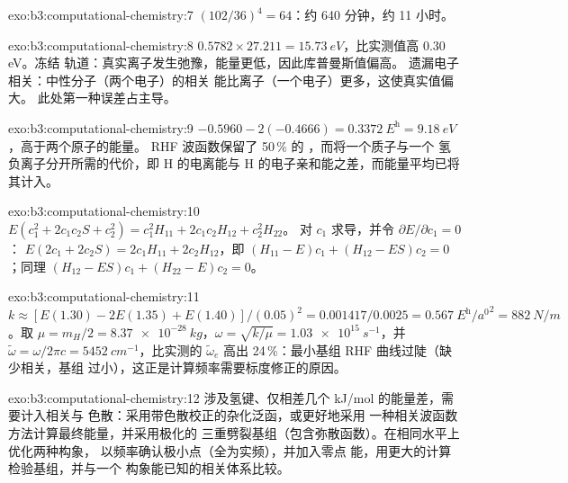 \begin{solution}{exo:b3:computational-chemistry:7}
$(102/36)^4 = 64$：约 640 分钟，约 11 小时。
\end{solution}

\begin{solution}{exo:b3:computational-chemistry:8}
$0.5782 \times 27.211 = \qty{15.73}{eV}$，比实测值高 0.30 eV。冻结
轨道：真实离子发生弛豫，能量更低，因此库普曼斯值偏高。
遗漏电子相关：中性分子（两个电子）的相关
能比离子（一个电子）更多，这使真实值偏大。
此处第一种误差占主导。
\end{solution}

\begin{solution}{exo:b3:computational-chemistry:9}
$-0.5960 - 2(-0.4666) = \qty{0.3372}{\hartree} = \qty{9.18}{eV}$，高于两个原子的能量。
RHF 波函数保留了 50\,\% 的 ，而将一个质子与一个
氢负离子分开所需的代价，即 H 的电离能与
H 的电子亲和能之差，而能量平均已将其计入。
\end{solution}

\begin{solution}{exo:b3:computational-chemistry:10}
$E(c_1^2 + 2c_1c_2S + c_2^2) = c_1^2H_{11} + 2c_1c_2H_{12} + c_2^2H_{22}$。
对 $c_1$ 求导，并令 $\partial E/\partial c_1 = 0$：
$E(2c_1 + 2c_2S) = 2c_1H_{11} + 2c_2H_{12}$，即 $(H_{11} - E)c_1 + (H_{12} -
ES)c_2 = 0$；同理 $(H_{12} - ES)c_1 + (H_{22} - E)c_2 = 0$。
\end{solution}

\begin{solution}{exo:b3:computational-chemistry:11}
$k \approx [E(1.30) - 2E(1.35) + E(1.40)]/(0.05)^2 = 0.001417/0.0025 =
\qty{0.567}{\hartree\per\bohr\squared} = \qty{882}{N/m}$。取 $\mu = m_H/2 =
\qty{8.37e-28}{kg}$，$\omega = \sqrt{k/\mu} = \qty{1.03e15}{s^{-1}}$，并
$\tilde\omega = \omega/2\pi c = \qty{5452}{cm^{-1}}$，比实测的
$\tilde\omega_e$ 高出 24\,\%：最小基组 RHF 曲线过陡（缺少相关，基组
过小），这正是计算频率需要标度修正的原因。
\end{solution}

\begin{solution}{exo:b3:computational-chemistry:12}
涉及氢键、仅相差几个 \unit{kJ/mol} 的能量差，需要计入相关与
色散：采用带色散校正的杂化泛函，或更好地采用
一种相关波函数方法计算最终能量，并采用极化的
三重劈裂基组（包含弥散函数）。在相同水平上优化两种构象，
以频率确认极小点（全为实频），并加入零点
能，用更大的计算检验基组，并与一个
构象能已知的相关体系比较。
\end{solution}

